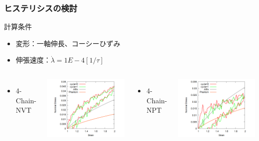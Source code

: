 \documentclass[12pt, dvipdfmx]{beamer}
\begin{document}
\begin{frame}
    \frametitle{ヒステリシスの検討}
        \begin{block}{計算条件}
            \begin{itemize}
                \item 変形：一軸伸長、コーシーひずみ
                \item 伸張速度：$\dot{\lambda} = 1E-4 [1/\tau]$
            \end{itemize}
        \end{block}
    \begin{columns}[T, onlytextwidth]
        \begin{itemize}
            \item 4-Chain-NVT
        \end{itemize}
            \includegraphics[width= \textwidth]{hyst_4Chain.png}
        \begin{itemize}
            \item 4-Chain-NPT
        \end{itemize}
            \includegraphics[width=\textwidth]{hyst_NPT_4Chain.png}
    \end{columns}
\end{frame}
\end{document}

